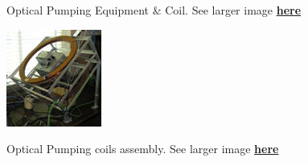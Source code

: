 \documentclass{../lab}
\begin{document}
\begin{figure}[h]
\begin{minipage}{0.36\textwidth}
    \caption{Optical Pumping Equipment \& Coil. See larger image \href{http://experimentationlab.berkeley.edu/sites/default/files/images/OPT_3548.jpg}{\textbf{here}}}
\end{minipage}
\begin{minipage}{0.25\textwidth}
    \href{http://experimentationlab.berkeley.edu/sites/default/files/images/OPT_Coils_Top_t9743.jpg}{\includegraphics[width=\linewidth,keepaspectratio]{images/OPT_Top_t9743.jpg}}
    \caption{Optical Pumping coils assembly. See larger image \href{http://experimentationlab.berkeley.edu/sites/default/files/images/OPT_Coils_Top_t9743.jpg}{\textbf{here}}}
\end{minipage}
\end{figure}
\end{document}
